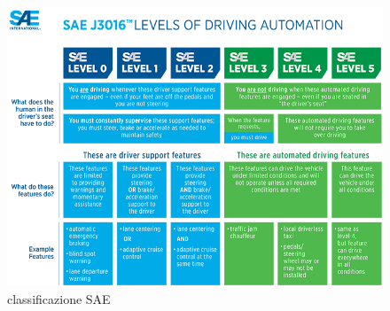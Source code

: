 \documentclass[14pt]{extarticle}
\begin{document}
\begin{figure}
\centering
\includegraphics[scale=0.5]{SAE_level_automation.png}
\caption{classificazione SAE}
\label{fig:classificazioneSAE}
\end{figure}

\end{document}
